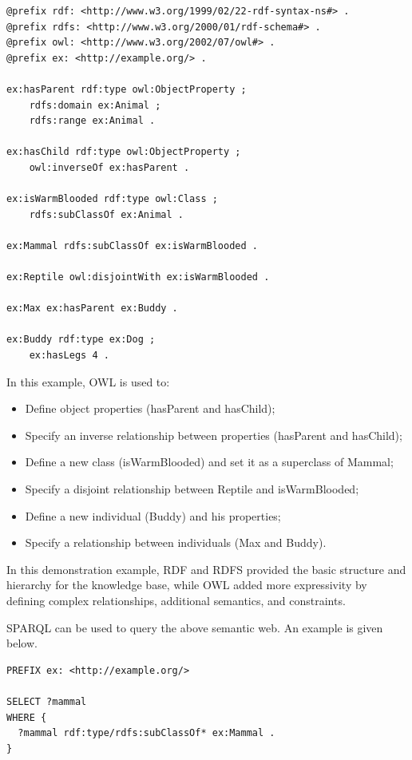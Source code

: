 \begin{mdframed}
\begin{lstlisting}
@prefix rdf: <http://www.w3.org/1999/02/22-rdf-syntax-ns#> .
@prefix rdfs: <http://www.w3.org/2000/01/rdf-schema#> .
@prefix owl: <http://www.w3.org/2002/07/owl#> .
@prefix ex: <http://example.org/> .

ex:hasParent rdf:type owl:ObjectProperty ;
    rdfs:domain ex:Animal ;
    rdfs:range ex:Animal .

ex:hasChild rdf:type owl:ObjectProperty ;
    owl:inverseOf ex:hasParent .

ex:isWarmBlooded rdf:type owl:Class ;
    rdfs:subClassOf ex:Animal .

ex:Mammal rdfs:subClassOf ex:isWarmBlooded .

ex:Reptile owl:disjointWith ex:isWarmBlooded .

ex:Max ex:hasParent ex:Buddy .

ex:Buddy rdf:type ex:Dog ;
    ex:hasLegs 4 .
\end{lstlisting}

In this example, OWL is used to:
\begin{itemize}
  \item Define object properties (hasParent and hasChild);
  \item Specify an inverse relationship between properties (hasParent and hasChild);
  \item Define a new class (isWarmBlooded) and set it as a superclass of Mammal;
  \item Specify a disjoint relationship between Reptile and isWarmBlooded;
  \item Define a new individual (Buddy) and his properties;
  \item Specify a relationship between individuals (Max and Buddy).
\end{itemize}

In this demonstration example, RDF and RDFS provided the basic structure and hierarchy for the knowledge base, while OWL added more expressivity by defining complex relationships, additional semantics, and constraints.

SPARQL can be used to query the above semantic web. An example is given below.

\begin{lstlisting}
PREFIX ex: <http://example.org/>

SELECT ?mammal
WHERE {
  ?mammal rdf:type/rdfs:subClassOf* ex:Mammal .
}
\end{lstlisting}

\end{mdframed}

